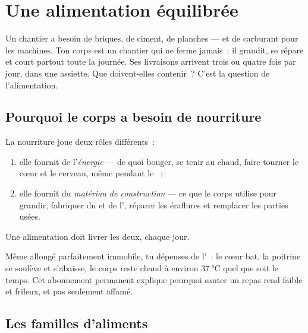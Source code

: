 \chapter{Une alimentation équilibrée}\label{ch:g3:balanced-diet}

Un chantier a besoin de briques, de ciment, de planches --- et de
carburant pour les machines. Ton corps est un chantier qui ne ferme
jamais~: il grandit, se répare et court partout toute la journée.
Ses livraisons arrivent trois ou quatre fois par jour, dans une
assiette. Que doivent-elles contenir~? C'est la question de
l'alimentation.

\section{Pourquoi le corps a besoin de nourriture}

\begin{proposition}\label{prop:g3:balanced-diet:jobs}
La nourriture joue deux rôles différents~:
\begin{enumerate}
  \item elle fournit de l'\emph{énergie}
--- de quoi bouger, se tenir au chaud, faire
        tourner le cœur et le cerveau, même pendant le ~;
  \item elle fournit du \emph{matériau de construction} --- ce que
        le corps utilise pour grandir, fabriquer du  et de
        l', réparer les éraflures et remplacer les parties usées.
\end{enumerate}
Une alimentation doit livrer les deux, chaque jour.
\end{proposition}
\admitted

\begin{example}\label{ex:g3:balanced-diet:rest}
Même allongé parfaitement immobile, tu dépenses de l'~: le
cœur bat, la poitrine se soulève et s'abaisse, le corps reste chaud
à environ $\qty{37}{\degreeCelsius}$ quel que soit le temps. Cet
abonnement permanent explique pourquoi sauter un repas rend faible
et frileux, et pas seulement affamé.
\end{example}

\section{Les familles d'aliments}

